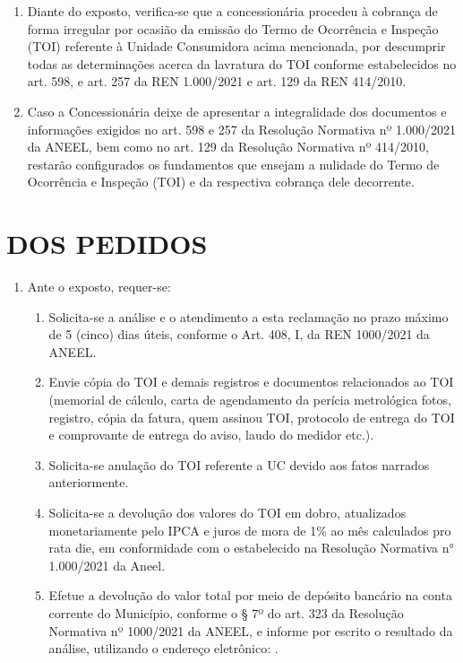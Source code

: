 \begin{enumerate}[resume]
{    IV – Efetuar a avaliação do histórico de consumo e grandezas elétricas; e
    
    V – Implementar, quando julgar necessário, os seguintes procedimentos:
    
    a) medição fiscalizadora, com registros de fornecimento em memória de massa de, no mínimo, 15 (quinze) dias consecutivos; e
    
    b) recursos visuais, tais como fotografias e vídeos.
    
    § 2º Uma cópia do TOI deve ser entregue ao consumidor ou àquele que acompanhar a inspeção, no ato da sua emissão, mediante recibo.
}

\item Diante do exposto, verifica-se que a concessionária procedeu à cobrança de forma irregular por ocasião da emissão do Termo de Ocorrência e Inspeção (TOI) referente à Unidade Consumidora acima mencionada, por descumprir todas as determinações acerca da lavratura do TOI conforme estabelecidos no art. 598, e art. 257 da REN 1.000/2021 e art. 129 da REN 414/2010.
\item Caso a Concessionária deixe de apresentar a integralidade dos documentos e informações exigidos no art. 598 e 257 da Resolução Normativa nº 1.000/2021 da ANEEL, bem como no art. 129 da Resolução Normativa nº 414/2010, restarão configurados os fundamentos que ensejam a nulidade do Termo de Ocorrência e Inspeção (TOI) e da respectiva cobrança dele decorrente.
\end{enumerate}

\section{DOS PEDIDOS}

\begin{enumerate}[resume]
\item Ante o exposto, requer-se:
\begin{enumerate}   
\item Solicita-se a análise e o atendimento a esta reclamação no prazo máximo de 5 (cinco) dias úteis, conforme o Art. 408, I, da REN 1000/2021 da ANEEL.
\item Envie cópia do TOI e demais registros e documentos relacionados ao TOI (memorial de cálculo, carta de agendamento da perícia metrológica fotos, registro, cópia da fatura, quem assinou TOI, protocolo de entrega do TOI e comprovante de entrega do aviso, laudo do medidor etc.).
\item Solicita-se anulação do TOI referente a UC devido aos fatos narrados anteriormente.
\item Solicita-se a devolução dos valores do TOI em dobro, atualizados monetariamente pelo IPCA e juros de mora de 1\% ao mês calculados pro rata die, em conformidade com o estabelecido na Resolução Normativa n° 1.000/2021 da Aneel.
\item Efetue a devolução do valor total por meio de depósito bancário na conta corrente do Município, conforme o § 7º do art. 323 da Resolução Normativa nº 1000/2021 da ANEEL, e informe por escrito o resultado da análise, utilizando o endereço eletrônico: \EmailEmpresa{}.
\end{enumerate}
\end{enumerate}